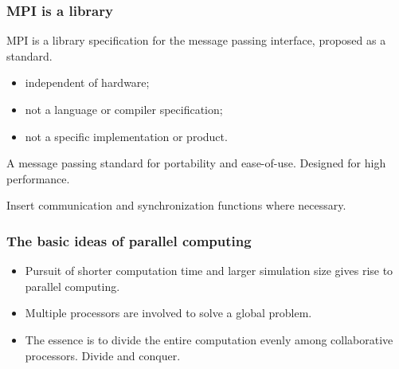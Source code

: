 \documentclass{beamer}
\begin{document}
\begin{frame}
\frametitle{MPI is a library}

\begin{block}{}
MPI is a library specification for the message passing interface,
proposed as a standard.

\begin{itemize}
\item independent of hardware;

\item not a language or compiler specification;

\item not a specific implementation or product.
\end{itemize}

\noindent
A message passing standard for portability and ease-of-use. 
Designed for high performance.

Insert communication and synchronization functions where necessary.


\end{block}
\end{frame}

\begin{frame}
\frametitle{The basic ideas of parallel computing}

\begin{block}{}

\begin{itemize}
\item Pursuit of shorter computation time and larger simulation size gives rise to parallel computing.

\item Multiple processors are involved to solve a global problem.

\item The essence is to divide the entire computation evenly among collaborative processors.  Divide and conquer.
\end{itemize}

\noindent
\end{block}
\end{frame}
\end{document}
